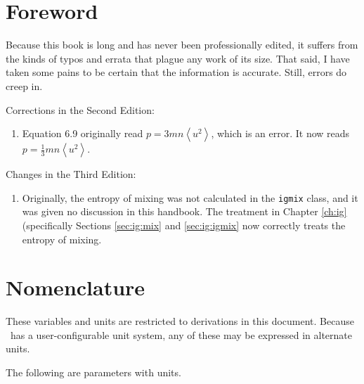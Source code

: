 \section*{Foreword}

Because this book is long and has never been professionally edited, it suffers from the kinds of typos and errata that plague any work of its size.  That said, I have taken some pains to be certain that the information is accurate.  Still, errors do creep in.

Corrections in the Second Edition:
\begin{enumerate}
\item Equation 6.9 originally read $p=3mn\left<u^2\right>$, which is an error. It now reads $p=\frac{1}{3}mn\left<u^2\right>$.
\end{enumerate}

Changes in the Third Edition:
\begin{enumerate}
\item Originally, the entropy of mixing was not calculated in the \texttt{igmix} class, and it was given no discussion in this handbook. The treatment in Chapter \ref{ch:ig} (specifically Sections \ref{sec:ig:mix} and \ref{sec:ig:igmix} now correctly treats the entropy of mixing.
\end{enumerate}

\section*{Nomenclature}

These variables and units are restricted to derivations in this document.  Because \PM\ has a user-configurable unit system, any of these may be expressed in alternate units.  

The following are parameters with units.

